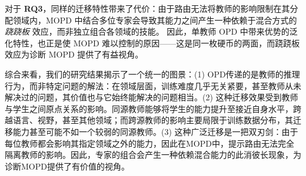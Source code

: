 对于 \textbf{RQ3}，同样的迁移特性带来了代价：由于路由无法将教师的影响限制在其分配领域内，MOPD 中结合多位专家会导致其能力之间产生一种依赖于混合方式的 \emph{跷跷板} 效应，而非独立组合各领域的技能。  
因此，单教师 OPD 中带来优势的泛化特性，也正是使 MOPD 难以控制的原因——这是同一枚硬币的两面，而跷跷板效应为诊断 MOPD 提供了有益视角。

综合来看，我们的研究结果揭示了一个统一的图景：(1) OPD传递的是教师的推理行为，而非特定问题的解法：在领域层面，训练难度几乎无关紧要，甚至教师从未解决过的问题，其价值也与它始终能解决的问题相当。(2) 这种迁移效果受到教师与学生之间原点关系的影响。同源教师能够将学生的能力提升至接近自身水平，跨越语言、视野，甚至其他领域；而跨源教师的影响主要局限于训练数据分布，其迁移能力甚至可能不如一个较弱的同源教师。(3) 这种广泛迁移是一把双刃剑：由于每位教师都会影响其指定领域之外的能力，因此在MOPD中，提示路由无法完全隔离教师的影响。因此，专家的组合会产生一种依赖混合能力的此消彼长现象，为诊断MOPD提供了有价值的视角。